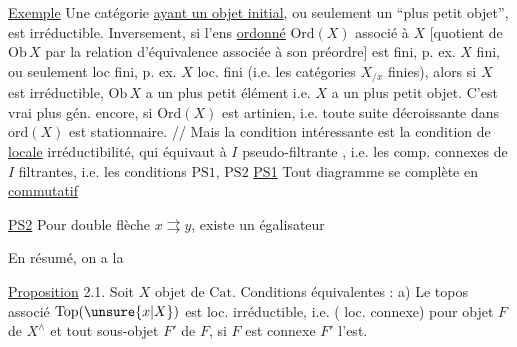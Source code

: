  \uline{Exemple} Une catégorie \uline{ayant un objet initial}, ou seulement un ``plus petit objet'', est irréductible.
Inversement, si l'ens \uline{ordonné} $\mathrm{Ord}(X)$ associé à $X$ [quotient de $\mathrm{Ob}\,X$ par la relation d'équivalence associée à son préordre] est fini, p. ex. $X$ fini,  ou seulement loc fini, p. ex. $X$ loc. fini (i.e. les catégories $X_{/x}$ finies), alors si $X$ est irréductible, $\mathrm{Ob}\,X$ a un plus petit élément i.e. $X$ a un plus petit objet.
C'est vrai plus gén. encore, si $\mathrm{Ord}(X)$ est artinien, i.e.  toute suite décroissante dans $\mathrm{ord}(X)$ est stationnaire. //
Mais la condition intéressante est la condition  de \uline{locale} irréductibilité, qui équivaut à $I$ pseudo-filtrante , i.e. les comp. connexes de $I$ filtrantes, i.e. les conditions $\mathrm{PS}1$, $\mathrm{PS}2$
\uline{PS1} Tout diagramme
se complète en
\uline{commutatif}

\uline{PS2} Pour  double flèche $x\rightrightarrows y$, existe un égalisateur

En résumé, on a la

\uline{Proposition} 2.1. Soit $X$  objet de $\mathrm{Cat}$. Conditions équivalentes :
a) Le topos associé $\mathrm{Top}(\unsure{x|X})$ est loc. irréductible, i.e.  ( loc. connexe) pour  objet  $F$ de  $X^\wedge$ et tout sous-objet $F'$ de $F$, si $F$ est connexe $F'$ l'est.

